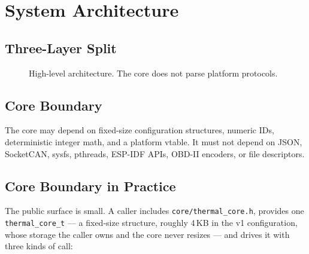 \section{System Architecture}

\subsection{Three-Layer Split}

\begin{figure}[h]
\centering
{}
\caption{High-level architecture. The core does not parse platform protocols.}
\label{fig:thermal-core-architecture}
\end{figure}

\subsection{Core Boundary}

The core may depend on fixed-size configuration structures, numeric IDs, deterministic integer math, and a platform vtable. It must not depend on JSON, SocketCAN, sysfs, pthreads, ESP-IDF APIs, OBD-II encoders, or file descriptors.

\subsection{Core Boundary in Practice}

The public surface is small. A caller includes \texttt{core/thermal\_core.h}, provides one \texttt{thermal\_core\_t} --- a fixed-size structure, roughly 4\,KB in the v1 configuration, whose storage the caller owns and the core never resizes --- and drives it with three kinds of call:

